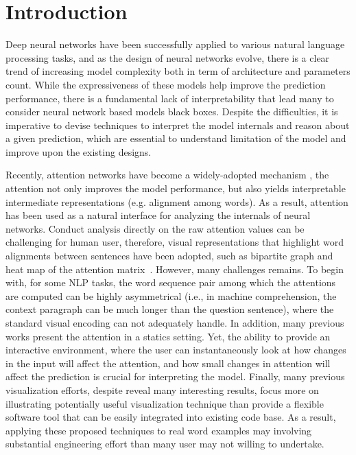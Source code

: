 \section{Introduction}

Deep neural networks have been successfully applied to various natural language processing tasks,
and as the design of neural networks evolve, there is a clear trend of increasing model complexity both in term of architecture and parameters count. 
%
While the expressiveness of these models help improve the prediction performance, there is a fundamental lack of interpretability that lead many to consider neural network based models black boxes. 
%
Despite the difficulties, it is imperative to devise techniques to interpret the model internals and reason about a given prediction, which are essential to understand limitation of the model and improve upon the existing designs.


Recently, attention networks have become a widely-adopted mechanism \cite{VaswaniShazeerParmar2017, Parikh2016}, the attention not only improves the model performance, but also yields interpretable intermediate representations (e.g. alignment among words). As a result, attention has been used as a natural interface for analyzing the internals of neural networks. Conduct analysis directly on the raw attention values can be challenging for human user, therefore, visual representations that highlight word alignments between sentences have been adopted, such as bipartite graph and heat map of the attention matrix~\cite{LiChenHovy2015, li2016understanding, lee2017interactive}.  However, many challenges remains. To begin with, for some NLP tasks, the word sequence pair among which the attentions are computed can be highly asymmetrical (i.e., in machine comprehension, the context paragraph can be much longer than the question sentence), where the standard visual encoding can not adequately handle.  In addition, many previous works present the attention in a statics setting. Yet, the ability to provide an interactive environment, where the user can instantaneously look at how changes in the input will affect the attention, and how small changes in attention will affect the prediction is crucial for interpreting the model. Finally, many previous visualization efforts, despite reveal many interesting results, focus more on illustrating potentially useful visualization technique than provide a flexible software tool that can be easily integrated into existing code base. As a result, applying these proposed techniques to real word examples may involving substantial engineering effort than many user may not willing to undertake.

